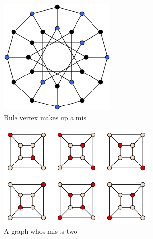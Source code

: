 \documentclass[10pt, a4paper, twocolumn]{article} %
\begin{document}
\begin{figure}
	\includegraphics[width=\linewidth]{mistwo.png} %
	\caption{Bule vertex makes up a mis} %
	\label{mistwo} %
\end{figure}

\begin{figure}
	\includegraphics[width=\linewidth]{misone.png} %
	\caption{A graph whos mis is two} %
	\label{misone} %
\end{figure}
\end{document}
